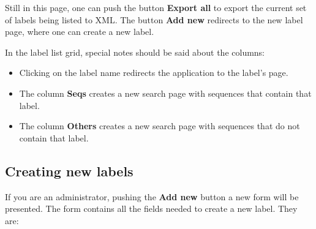 Still in this page, one can push the button \textbf{Export all} to export the current set of
labels being listed to XML. The button \textbf{Add new} redirects to the new label page, where one can
create a new label.

In the label list grid, special notes should be said about the columns:

\begin{itemize}
  \item Clicking on the label name redirects the application to the label's page.
  \item The column \textbf{Seqs} creates a new search page with sequences that contain that label.
  \item The column \textbf{Others} creates a new search page with sequences that do not contain that label.
\end{itemize}

\subsection{Creating new labels}

If you are an administrator, pushing the \textbf{Add new} button a new form will be presented.
The form contains all the fields needed to create a new label. They are:


